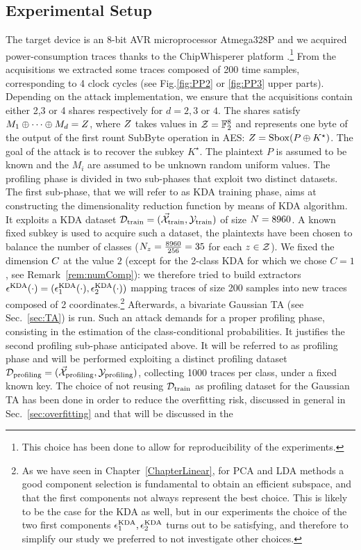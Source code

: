 \subsection{Experimental Setup}
The target device is an 8-bit AVR microprocessor Atmega328P and we acquired power-consumption traces thanks to the ChipWhisperer platform \cite{o2014chipwhisperer}.\footnote{This choice has been done to allow for reproducibility of the experiments.} From the acquisitions we extracted some traces composed of 200 time samples, corresponding to 4 clock cycles (see Fig.\ref{fig:PP2} or \ref{fig:PP3} upper parts). Depending on the attack implementation, we ensure that the acquisitions contain either 2,3 or 4 shares respectively for $d=2,3$ or $4$. The shares satisfy $M_1 \oplus \dots \oplus M_d = Z$,
where $Z$ takes values in $\mathcal{Z} = \mathbb{F}_2^8$ and represents one byte of the output of the first rount SubByte operation in AES: $Z = \mathrm{Sbox}(P\oplus K^\star)$. The goal of the attack is to recover the subkey $K^\star$. The plaintext $P$ is assumed to be known and the $M_i$ are assumed to be unknown random uniform values. The profiling phase is divided in two sub-phases that exploit two distinct datasets. The first sub-phase, that we will refer to as KDA training phase, aims at constructing the dimensionality reduction function by means of KDA algorithm. It exploits a KDA dataset $\mathcal{D}_{\text{train}} = (\vec{\mathcal{X}}_{\text{train}},\mathcal{Y}_{\text{train}})$ of size $N=8960$.  A known fixed subkey is used to acquire such a dataset, the plaintexts have been chosen to balance the number of classes ($N_{z}=\frac{8960}{256}=35$  for each $z\in \mathcal{Z}$).  We fixed the dimension $C$  at the value $2$ (except for the 2-class KDA for which we chose $C=1$, see Remark~\ref{rem:numComp}): we therefore tried to build extractors $\epsilon^{\mathrm{KDA}}(\cdot) = (\epsilon^{\mathrm{KDA}}_1(\cdot), \epsilon^{\mathrm{KDA}}_2(\cdot))$ mapping traces of size 200 samples into new traces composed of 2 coordinates.\footnote{As we have seen in Chapter~\ref{ChapterLinear}, for PCA and LDA methods a good component selection is fundamental to obtain an efficient subspace, and that the first components not always represent the best choice. This is likely to be the case for the KDA as well, but in our experiments the choice of the two first components $\epsilon^{\mathrm{KDA}}_1, \epsilon^{\mathrm{KDA}}_2$ turns out to be satisfying, and therefore to simplify our study we preferred to not investigate other choices.} Afterwards, a bivariate Gaussian TA (see Sec.~\ref{sec:TA}) is run. Such an attack demands for a proper profiling phase, consisting in the estimation of the  class-conditional probabilities. It justifies the second profiling sub-phase anticipated above. It will be referred to as profiling phase and will be performed exploiting a distinct profiling dataset  $\mathcal{D}_{\text{profiling}} = (\vec{\mathcal{X}}_{\text{profiling}},\mathcal{Y}_{\text{profiling}})$, collecting 1000 traces per class, under a fixed known key. The choice of not reusing $\mathcal{D}_{\text{train}}$ as profiling dataset for the Gaussian TA has been done in order to reduce the overfitting risk, discussed in general in Sec.~\ref{sec:overfitting} and that will be discussed in the 
